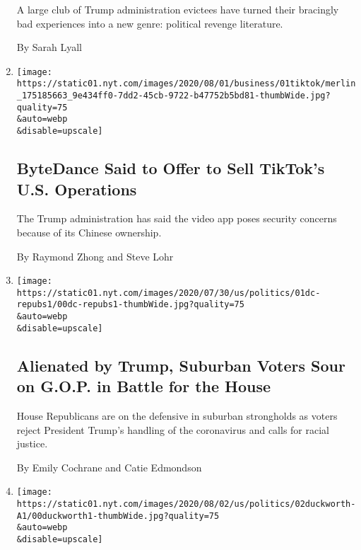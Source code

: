 \begin{enumerate}
  A large club of Trump administration evictees have turned their
  bracingly bad experiences into a new genre: political revenge
  literature.

  By Sarah Lyall
\item
  \href{/2020/08/01/technology/tiktok-sale-trump-ban.html}{}

  \texttt{[image: https://static01.nyt.com/images/2020/08/01/business/01tiktok/merlin\_175185663\_9e434ff0-7dd2-45cb-9722-b47752b5bd81-thumbWide.jpg?quality=75\\\&auto=webp\\\&disable=upscale]}

  \hypertarget{bytedance-said-to-offer-to-sell-tiktoks-us-operations}{%
  \subsection{ByteDance Said to Offer to Sell TikTok's U.S.
  Operations}\label{bytedance-said-to-offer-to-sell-tiktoks-us-operations}}

  The Trump administration has said the video app poses security
  concerns because of its Chinese ownership.

  By Raymond Zhong and Steve Lohr
\item
  \href{/2020/08/01/us/politics/trump-suburban-voters-republicans-house.html}{}

  \texttt{[image: https://static01.nyt.com/images/2020/07/30/us/politics/01dc-repubs1/00dc-repubs1-thumbWide.jpg?quality=75\\\&auto=webp\\\&disable=upscale]}

  \hypertarget{alienated-by-trump-suburban-voters-sour-on-gop-in-battle-for-the-house-1}{%
  \subsection{Alienated by Trump, Suburban Voters Sour on G.O.P. in
  Battle for the
  House}\label{alienated-by-trump-suburban-voters-sour-on-gop-in-battle-for-the-house-1}}

  House Republicans are on the defensive in suburban strongholds as
  voters reject President Trump's handling of the coronavirus and calls
  for racial justice.

  By Emily Cochrane and Catie Edmondson
\item
  \href{/2020/08/01/us/politics/tammy-duckworth-biden-vp.html}{}

  \texttt{[image: https://static01.nyt.com/images/2020/08/02/us/politics/02duckworth-A1/00duckworth1-thumbWide.jpg?quality=75\\\&auto=webp\\\&disable=upscale]}

  \hypertarget{tammy-duckworth-is-nothing-and-everything-like-joe-biden-1}{%
}
\end{enumerate}
